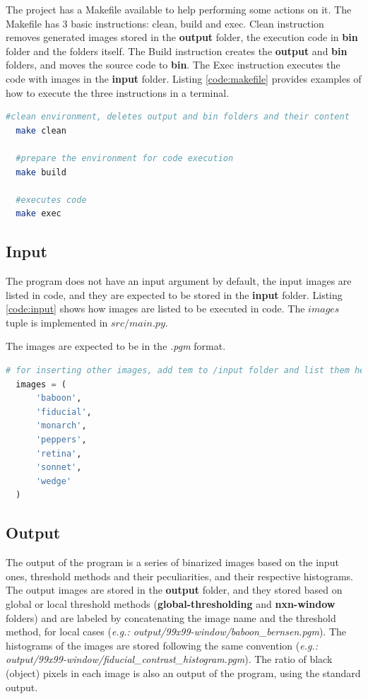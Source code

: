 \documentclass[]{IEEEtran}
\begin{document}
The project has a Makefile available to help performing some actions on it. The Makefile has 3 basic instructions: clean, build and exec. Clean instruction removes generated images stored in the \textbf{output} folder, the execution code in \textbf{bin} folder and the folders itself. The Build instruction creates the \textbf{output} and \textbf{bin} folders, and moves the source code to \textbf{bin}. The Exec instruction executes the code with images in the \textbf{input} folder. Listing \ref{code:makefile} provides examples of how to execute the three instructions in a terminal.
\begin{lstlisting}[language=sh, caption={Makefile usage example}, label={code:makefile}]
  #clean environment, deletes output and bin folders and their content
  make clean
  
  #prepare the environment for code execution
  make build 

  #executes code
  make exec
\end{lstlisting}

\subsection{Input}

The program does not have an input argument by default, the input images are listed in code, and they are expected to be stored in the \textbf{input} folder. Listing \ref{code:input} shows how images are listed to be executed in code. The $images$ tuple is implemented in $src/main.py$.
\par The images are expected to be in the \textit{.pgm} format.

\begin{lstlisting}[language=Python, caption={Input images inside code}, label={code:input}]
  # for inserting other images, add tem to /input folder and list them here
  images = (
      'baboon',
      'fiducial',
      'monarch',
      'peppers',
      'retina',
      'sonnet',
      'wedge'
  )
\end{lstlisting}

\subsection{Output}
The output of the program is a series of binarized images based on the input ones, threshold methods and their peculiarities, and their respective histograms. The output images are stored in the \textbf{output} folder, and they stored based on global or local threshold methods (\textbf{global-thresholding} and \textbf{nxn-window} folders) and are labeled by concatenating the image name and the threshold method, for local cases (\textit{e.g.: output/99x99-window/baboon\_bernsen.pgm}). The histograms of the images are stored following the same convention (\textit{e.g.: output/99x99-window/fiducial\_contrast\_histogram.pgm}). The ratio of black (object) pixels in each image is also an output of the program, using the standard output. 
\end{document}

